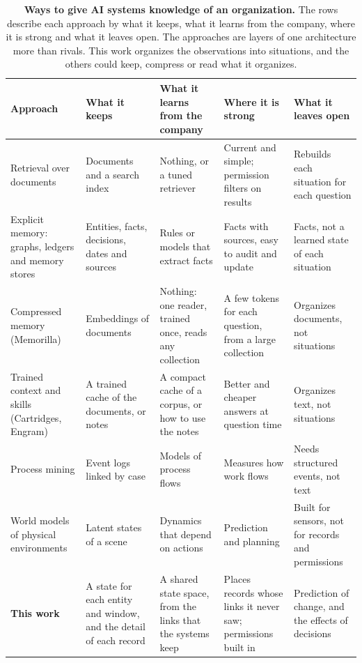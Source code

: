 \documentclass[11pt]{article}
\begin{document}
\begin{table}[t]
\centering
\scriptsize
\caption{\textbf{Ways to give AI systems knowledge of an organization.} The rows describe each approach by what it keeps, what it learns from the company, where it is strong and what it leaves open. The approaches are layers of one architecture more than rivals. This work organizes the observations into situations, and the others could keep, compress or read what it organizes.}
\label{tab:compare}
\renewcommand{\arraystretch}{1.25}
\setlength{\tabcolsep}{4pt}
\begin{tabularx}{\linewidth}{>{\raggedright\arraybackslash}p{2.55cm}>{\raggedright\arraybackslash}X>{\raggedright\arraybackslash}X>{\raggedright\arraybackslash}X>{\raggedright\arraybackslash}X}
\toprule
Approach & What it keeps & What it learns from the company & Where it is strong & What it leaves open \\
\midrule
Retrieval over documents\citep{lewis2020rag} & Documents and a search index & Nothing, or a tuned retriever & Current and simple; permission filters on results & Rebuilds each situation for each question \\
Explicit memory: graphs, ledgers and memory stores\citep{edge2024graphrag,packer2023memgpt,rasmussen2025zep,chhikara2025mem0} & Entities, facts, decisions, dates and sources & Rules or models that extract facts & Facts with sources, easy to audit and update & Facts, not a learned state of each situation \\
Compressed memory (Memorilla\citep{fallahpour2026memorilla}) & Embeddings of documents & Nothing: one reader, trained once, reads any collection & A few tokens for each question, from a large collection & Organizes documents, not situations \\
Trained context and skills (Cartridges\citep{eyuboglu2025cartridges}, Engram\citep{engram2026notes}) & A trained cache of the documents, or notes & A compact cache of a corpus, or how to use the notes & Better and cheaper answers at question time & Organizes text, not situations \\
Process mining\citep{vanderaalst2016process,vanderaalst2019object} & Event logs linked by case & Models of process flows & Measures how work flows & Needs structured events, not text \\
World models of physical environments\citep{assran2025vjepa2,zhang2026hjepa} & Latent states of a scene & Dynamics that depend on actions & Prediction and planning & Built for sensors, not for records and permissions \\
\textbf{This work} & A state for each entity and window, and the detail of each record & A shared state space, from the links that the systems keep & Places records whose links it never saw; permissions built in & Prediction of change, and the effects of decisions \\
\bottomrule
\end{tabularx}
\end{table}
\end{document}
